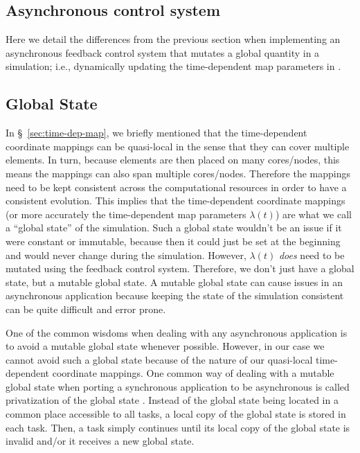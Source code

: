 \begin{bibunit}[unsrtnat]
\section{Asynchronous control system\label{sec:async-control-system}}

Here we detail the differences from the previous section
when implementing an asynchronous feedback control
system that mutates a global quantity in a simulation; i.e., dynamically
updating the time-dependent map parameters in \spectre.

\subsection{Global State\label{sec:global-state}}

In \S~\ref{sec:time-dep-map}, we briefly mentioned that the time-dependent
coordinate mappings can be quasi-local in the sense that they can cover multiple
elements. In turn, because elements are then placed on many cores/nodes, this
means the mappings can also span multiple cores/nodes. Therefore the mappings
need to be kept consistent across the computational resources in order to have a
consistent evolution. This implies that the time-dependent coordinate mappings
(or more accurately the time-dependent map parameters $\lambda(t)$) are what we
call a ``global state'' of the simulation. Such a global state
wouldn't be an issue if it were constant or immutable, because then it could just
be set at the beginning and would never change during the simulation.
However, $\lambda(t)$ \textit{does} need to be mutated
using the feedback control system. Therefore, we don't just have
a global state, but a mutable global state. A mutable global state can cause
issues in an asynchronous application because keeping the state of the simulation
consistent can be quite difficult and error prone.

One of the common wisdoms when dealing with any asynchronous application is to
avoid a mutable global state whenever possible. However, in our case we cannot
avoid such a global state because of the nature of our quasi-local
time-dependent coordinate mappings. One common way of dealing with a mutable
global state when porting a synchronous application to be asynchronous is called
privatization of the global state \cite{Solihin2020-en}. Instead of the global
state being located in a common place accessible to all tasks, a local copy of
the global state is stored in each task. Then, a task simply continues until
its local copy of the global state is invalid and/or it receives a new global
state.


\end{bibunit}
